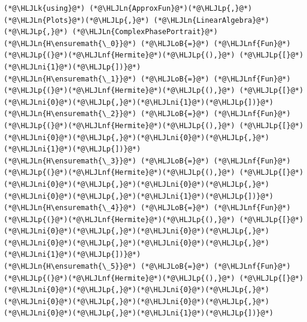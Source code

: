 \documentclass[12pt,a4paper]{article}
\newcommand{\HLJLk}[1]{\textcolor[RGB]{148,91,176}{\textbf{#1}}}
\newcommand{\HLJLn}[1]{#1}
\newcommand{\HLJLnf}[1]{\textcolor[RGB]{66,102,213}{#1}}
\newcommand{\HLJLni}[1]{\textcolor[RGB]{59,151,46}{#1}}
\newcommand{\HLJLoB}[1]{\textcolor[RGB]{102,102,102}{\textbf{#1}}}
\newcommand{\HLJLp}[1]{#1}
\begin{document}
\begin{lstlisting}
(*@\HLJLk{using}@*) (*@\HLJLn{ApproxFun}@*)(*@\HLJLp{,}@*) (*@\HLJLn{Plots}@*)(*@\HLJLp{,}@*) (*@\HLJLn{LinearAlgebra}@*)(*@\HLJLp{,}@*) (*@\HLJLn{ComplexPhasePortrait}@*)
(*@\HLJLn{H\ensuremath{\_0}}@*) (*@\HLJLoB{=}@*) (*@\HLJLnf{Fun}@*)(*@\HLJLp{(}@*)(*@\HLJLnf{Hermite}@*)(*@\HLJLp{(),}@*) (*@\HLJLp{[}@*)(*@\HLJLni{1}@*)(*@\HLJLp{])}@*)
(*@\HLJLn{H\ensuremath{\_1}}@*) (*@\HLJLoB{=}@*) (*@\HLJLnf{Fun}@*)(*@\HLJLp{(}@*)(*@\HLJLnf{Hermite}@*)(*@\HLJLp{(),}@*) (*@\HLJLp{[}@*)(*@\HLJLni{0}@*)(*@\HLJLp{,}@*)(*@\HLJLni{1}@*)(*@\HLJLp{])}@*)
(*@\HLJLn{H\ensuremath{\_2}}@*) (*@\HLJLoB{=}@*) (*@\HLJLnf{Fun}@*)(*@\HLJLp{(}@*)(*@\HLJLnf{Hermite}@*)(*@\HLJLp{(),}@*) (*@\HLJLp{[}@*)(*@\HLJLni{0}@*)(*@\HLJLp{,}@*)(*@\HLJLni{0}@*)(*@\HLJLp{,}@*)(*@\HLJLni{1}@*)(*@\HLJLp{])}@*)
(*@\HLJLn{H\ensuremath{\_3}}@*) (*@\HLJLoB{=}@*) (*@\HLJLnf{Fun}@*)(*@\HLJLp{(}@*)(*@\HLJLnf{Hermite}@*)(*@\HLJLp{(),}@*) (*@\HLJLp{[}@*)(*@\HLJLni{0}@*)(*@\HLJLp{,}@*)(*@\HLJLni{0}@*)(*@\HLJLp{,}@*)(*@\HLJLni{0}@*)(*@\HLJLp{,}@*)(*@\HLJLni{1}@*)(*@\HLJLp{])}@*)
(*@\HLJLn{H\ensuremath{\_4}}@*) (*@\HLJLoB{=}@*) (*@\HLJLnf{Fun}@*)(*@\HLJLp{(}@*)(*@\HLJLnf{Hermite}@*)(*@\HLJLp{(),}@*) (*@\HLJLp{[}@*)(*@\HLJLni{0}@*)(*@\HLJLp{,}@*)(*@\HLJLni{0}@*)(*@\HLJLp{,}@*)(*@\HLJLni{0}@*)(*@\HLJLp{,}@*)(*@\HLJLni{0}@*)(*@\HLJLp{,}@*)(*@\HLJLni{1}@*)(*@\HLJLp{])}@*)
(*@\HLJLn{H\ensuremath{\_5}}@*) (*@\HLJLoB{=}@*) (*@\HLJLnf{Fun}@*)(*@\HLJLp{(}@*)(*@\HLJLnf{Hermite}@*)(*@\HLJLp{(),}@*) (*@\HLJLp{[}@*)(*@\HLJLni{0}@*)(*@\HLJLp{,}@*)(*@\HLJLni{0}@*)(*@\HLJLp{,}@*)(*@\HLJLni{0}@*)(*@\HLJLp{,}@*)(*@\HLJLni{0}@*)(*@\HLJLp{,}@*)(*@\HLJLni{0}@*)(*@\HLJLp{,}@*)(*@\HLJLni{1}@*)(*@\HLJLp{])}@*)


\end{lstlisting}
\end{document}
